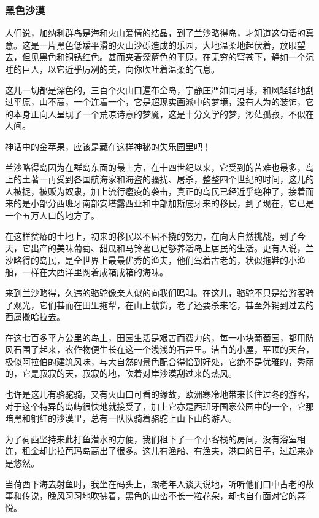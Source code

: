 \subsubsection*{黑色沙漠}
\par 人们说，加纳利群岛是海和火山爱情的结晶，到了兰沙略得岛，才知道这句话的真意。这是一片黑色低矮平滑的火山沙砾造成的乐园，大地温柔地起伏着，放眼望去，但见黑色和铜锈红色。甚而夹着深蓝色的平原，在无穷的穹苍下，静如一个沉睡的巨人，以它近乎厉冽的美，向你吹吐着温柔的气息。
\par 这儿一切都是深色的，三百个火山口遍布全岛，宁静庄严如同月球，和风轻轻地刮过平原，山不高，一个连着一个，它是超现实画派中的梦境，没有人为的装饰，它的本身正向人呈现了一个荒凉诗意的梦魇，这是十分文学的梦，渺茫孤寂，不似在人间。
\par 神话中的金苹果，应该是藏在这样神秘的失乐园里吧！
\par 兰沙略得岛因为在群岛东面的最上方，在十四世纪以来，它受到的苦难也最多，岛上的土著一再受到各国航海家和海盗的骚扰、屠杀，整整四个世纪的时间，这儿的人被捉，被贩为奴隶，加上流行瘟疫的袭击，真正的岛民已经近乎绝种了，接着而来的是小部分西班牙南部安塔露西亚和中部加斯底牙来的移民，到了现在，它已是一个五万人口的地方了。
\par 在这样贫瘠的土地上，初来的移民以不屈不挠的努力，在向大自然挑战，到了今天，它出产的美味葡萄、甜瓜和马铃薯已足够养活岛上居民的生活。更有人说，兰沙略得的岛民，是全世界上最最优秀的渔夫，他们驾着古老的，状似拖鞋的小渔船，一样在大西洋里网着成箱成箱的海味。
\par 来到兰沙略得，久违的骆驼像亲人似的向我们鸣叫。在这儿，骆驼不只是给游客骑了观光，它们甚而在田里拖犁，在山上载货，老了还要杀来吃，甚至外销到过去的西属撒哈拉去。
\par 在这七百多平方公里的岛上，田园生活是艰苦而费力的，每一小块葡萄园，都用防风石围了起来，农作物便生长在这一个浅浅的石井里。洁白的小屋，平顶的天台，极似阿拉伯的建筑风味，与大自然的景色配合得恰到好处，它绝不是优雅的，秀丽的，它是寂寂的天，寂寂的地，吹着对岸沙漠刮过来的热风。
\par 也许是这儿有骆驼骑，又有火山口可看的缘故，欧洲寒冷地带来长住过冬的游客，对于这个特异的岛屿很快地就接受了，加上它亦是西班牙国家公园中的一个，它那暗黑和铜红的沙漠里，总有一队队骑着骆驼上山下山的游人。
\par 为了荷西坚持来此打鱼潜水的方便，我们租下了一个小客栈的房间，没有浴室相连，租金却比拉芭玛岛高出了很多。这儿有渔船、有渔夫，港口的日子，过起来亦是悠然。
\par 当荷西下海去射鱼时，我坐在码头上，跟老年人谈天说地，听听他们口中古老的故事和传说，晚风习习地吹拂着，黑色的山峦不长一粒花朵，却也自有面对它的喜悦。
